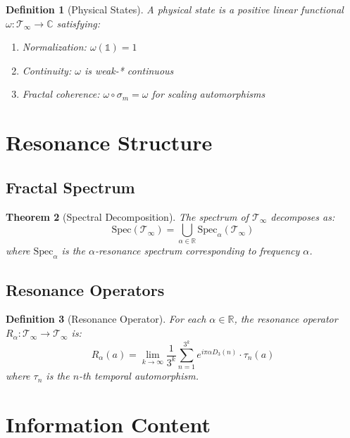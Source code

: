 \documentclass[12pt,letterpaper]{article}
\newcommand{\R}{\mathbb{R}}
\newcommand{\C}{\mathbb{C}}
\newcommand{\timelessfield}{\mathcal{T}_\infty}
\newcommand{\digitalsum}{D_3}
\newtheorem{theorem}{Theorem}[section]
\newtheorem{definition}[theorem]{Definition}
\begin{document}
\begin{definition}[Physical States]
A physical state is a positive linear functional $\omega: \timelessfield \to \C$ satisfying:
\begin{enumerate}
\item Normalization: $\omega(\mathbb{1}) = 1$
\item Continuity: $\omega$ is weak-* continuous
\item Fractal coherence: $\omega \circ \sigma_m = \omega$ for scaling automorphisms
\end{enumerate}
\end{definition}

\section{Resonance Structure}

\subsection{Fractal Spectrum}

\begin{theorem}[Spectral Decomposition]
The spectrum of $\timelessfield$ decomposes as:
\begin{equation}
\text{Spec}(\timelessfield) = \bigcup_{\alpha \in \R} \text{Spec}_\alpha(\timelessfield)
\end{equation}
where $\text{Spec}_\alpha$ is the $\alpha$-resonance spectrum corresponding to frequency $\alpha$.
\end{theorem}

\subsection{Resonance Operators}

\begin{definition}[Resonance Operator]
For each $\alpha \in \R$, the resonance operator $R_\alpha: \timelessfield \to \timelessfield$ is:
\begin{equation}
R_\alpha(a) = \lim_{k \to \infty} \frac{1}{3^k} \sum_{n=1}^{3^k} e^{i\pi\alpha\digitalsum(n)} \cdot \tau_n(a)
\end{equation}
where $\tau_n$ is the $n$-th temporal automorphism.
\end{definition}

\section{Information Content}
\end{document}

